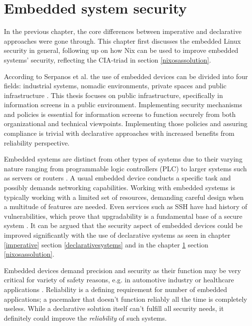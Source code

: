\chapter{Embedded system security} \label{embedded}

In the previous chapter, the core differences between imperative and
declarative approaches were gone through. This chapter first discusses
the embedded Linux security in general, following up on how Nix can be
used to improve embedded systems' security, reflecting the CIA-triad in section
\ref{nixosassolution}.

According to Serpanos et al. the use of embedded devices can be
divided into four fields: industrial systems, nomadic environments,
private spaces and public infrastructure
\cite{serpanos2013security}. This thesis focuses on public
infrastructure, specifically in information screens in a public
environment. Implementing security mechanisms and policies is
essential for information screens to function securely from both
organizational and technical viewpoints. Implementing those policies
and assuring compliance is trivial with declarative approaches with
increased benefits from reliability perspective.

Embedded systems are distinct from other types of systems due to their
varying nature ranging from programmable logic controllers (PLC) to
larger systems such as servers or
routers \cite{fysarakis2014embedded}. A usual embedded device
conducts a specific task and possibly demands networking
capabilities. Working with embedded systems is typically working with a
limited set of resources, demanding careful design when a multitude of
features are needed. Even services such as SSH have
had history of vulnerabilities, which prove that upgradability is a
fundamental base of a secure system
\cite{secopsolutionHistorySecOps}. It can be argued that the security aspect of
embedded devices could be improved significantly with the use of
declarative systems as seen in chapter \ref{imperative} section
\ref{declarativesystems} and in the chapter \ref{embedded} section
\ref{nixosassolution}.

Embedded devices demand precision and security as their function may
be very critical for variety of safety reasons, e.g. in automotive
industry or healthcare applications \cite{turab2019secure,
  fysarakis2014embedded}. Reliability is a defining requirement for
number of embedded applications; a pacemaker that doesn't function reliably all
the time is completely useless. While a declarative solution
itself can't fulfill all security needs, it definitely could improve
the \textit{reliability} of such systems.


